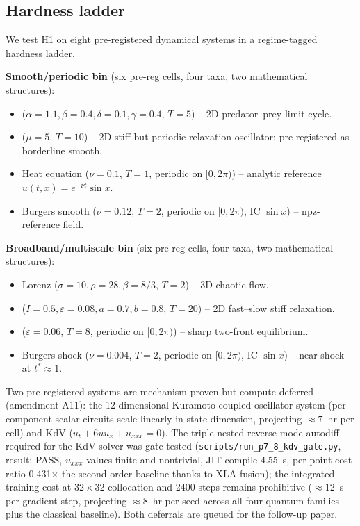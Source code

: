 \subsection{Hardness ladder}
\label{sec:methods-ladder}

We test H1 on eight pre-registered dynamical systems in a
regime-tagged hardness ladder.

\textbf{Smooth/periodic bin} (six pre-reg cells, four taxa, two
mathematical structures):
\begin{itemize}
  \item \lv{} ($\alpha = 1.1, \beta = 0.4, \delta = 0.1,
        \gamma = 0.4$, $T = 5$) -- 2D predator--prey limit cycle.
  \item \vdp{} ($\mu = 5$, $T = 10$) -- 2D stiff but periodic
        relaxation oscillator; pre-registered as borderline
        smooth.
  \item Heat equation ($\nu = 0.1$, $T = 1$, periodic
        on $[0, 2\pi)$) -- analytic reference
        $u(t,x) = e^{-\nu t}\sin x$.
  \item Burgers smooth ($\nu = 0.12$, $T = 2$, periodic on
        $[0, 2\pi)$, IC $\sin x$) -- npz-reference field.
\end{itemize}

\textbf{Broadband/multiscale bin} (six pre-reg cells, four taxa,
two mathematical structures):
\begin{itemize}
  \item Lorenz ($\sigma = 10, \rho = 28, \beta = 8/3$, $T = 2$)
        -- 3D chaotic flow.
  \item \fhn{} ($I = 0.5, \varepsilon = 0.08, a = 0.7, b = 0.8$,
        $T = 20$) -- 2D fast--slow stiff relaxation.
  \item \ac{} ($\varepsilon = 0.06$, $T = 8$, periodic on
        $[0, 2\pi)$) -- sharp two-front equilibrium.
  \item Burgers shock ($\nu = 0.004$, $T = 2$, periodic on
        $[0, 2\pi)$, IC $\sin x$) -- near-shock at $t^* \approx 1$.
\end{itemize}

Two pre-registered systems are mechanism-proven-but-compute-deferred
(amendment A11): the 12-dimensional Kuramoto coupled-oscillator
system (per-component scalar circuits scale linearly in state
dimension, projecting $\approx 7$~hr per cell) and KdV
($u_t + 6 u u_x + u_{xxx} = 0$). The triple-nested reverse-mode
autodiff required for the KdV solver was gate-tested
(\texttt{scripts/run\_p7\_8\_kdv\_gate.py}, result:
PASS, $u_{xxx}$ values finite and nontrivial, JIT compile
4.55~s, per-point cost ratio 0.431$\times$ the second-order
baseline thanks to XLA fusion); the integrated training cost at
$32 \times 32$ collocation and 2400 steps remains prohibitive
($\approx 12$~s per gradient step, projecting $\approx 8$~hr
per seed across all four quantum families plus the classical
baseline). Both deferrals are queued for the follow-up paper.

